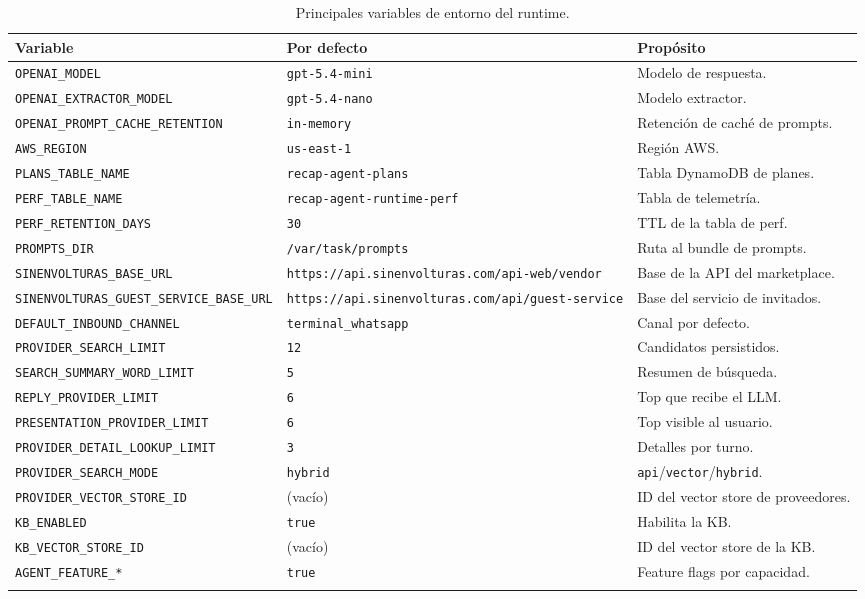 \documentclass[11pt,a4paper]{article}
\begin{document}
\begin{longtable}{p{6.0cm}p{3.5cm}p{6.0cm}}
\toprule
\textbf{Variable} & \textbf{Por defecto} & \textbf{Propósito} \\
\midrule
\endhead

\texttt{OPENAI\_MODEL} & \texttt{gpt-5.4-mini} & Modelo de respuesta. \\
\texttt{OPENAI\_EXTRACTOR\_MODEL} & \texttt{gpt-5.4-nano} & Modelo extractor. \\
\texttt{OPENAI\_PROMPT\_CACHE\_RETENTION} & \texttt{in-memory} & Retención de caché de prompts. \\
\texttt{AWS\_REGION} & \texttt{us-east-1} & Región AWS. \\
\texttt{PLANS\_TABLE\_NAME} & \texttt{recap-agent-plans} & Tabla DynamoDB de planes. \\
\texttt{PERF\_TABLE\_NAME} & \texttt{recap-agent-runtime-perf} & Tabla de telemetría. \\
\texttt{PERF\_RETENTION\_DAYS} & \texttt{30} & TTL de la tabla de perf. \\
\texttt{PROMPTS\_DIR} & \texttt{/var/task/prompts} & Ruta al bundle de prompts. \\
\texttt{SINENVOLTURAS\_BASE\_URL} &
  \texttt{https://api.sinenvolturas.com/api-web/vendor} &
  Base de la API del marketplace. \\
\texttt{SINENVOLTURAS\_GUEST\_SERVICE\_BASE\_URL} &
  \texttt{https://api.sinenvolturas.com/api/guest-service} &
  Base del servicio de invitados. \\
\texttt{DEFAULT\_INBOUND\_CHANNEL} & \texttt{terminal\_whatsapp} & Canal por defecto. \\
\texttt{PROVIDER\_SEARCH\_LIMIT} & \texttt{12} & Candidatos persistidos. \\
\texttt{SEARCH\_SUMMARY\_WORD\_LIMIT} & \texttt{5} & Resumen de búsqueda. \\
\texttt{REPLY\_PROVIDER\_LIMIT} & \texttt{6} & Top que recibe el LLM. \\
\texttt{PRESENTATION\_PROVIDER\_LIMIT} & \texttt{6} & Top visible al usuario. \\
\texttt{PROVIDER\_DETAIL\_LOOKUP\_LIMIT} & \texttt{3} & Detalles por turno. \\
\texttt{PROVIDER\_SEARCH\_MODE} & \texttt{hybrid} & \texttt{api}/\texttt{vector}/\texttt{hybrid}. \\
\texttt{PROVIDER\_VECTOR\_STORE\_ID} & (vacío) & ID del vector store de proveedores. \\
\texttt{KB\_ENABLED} & \texttt{true} & Habilita la KB. \\
\texttt{KB\_VECTOR\_STORE\_ID} & (vacío) & ID del vector store de la KB. \\
\texttt{AGENT\_FEATURE\_*} & \texttt{true} & Feature flags por capacidad. \\

\bottomrule
\caption{Principales variables de entorno del runtime.}
\end{longtable}
\end{document}
